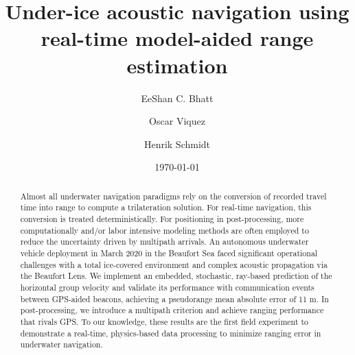 \title[JASA/draft]{Under-ice acoustic navigation using real-time model-aided range estimation}
\author{EeShan C. Bhatt}
\author{Oscar Viquez}
\author{Henrik Schmidt}



\date{\today}

\begin{abstract}
Almost all underwater navigation paradigms rely on the conversion of recorded travel time into range to compute a trilateration solution.
For real-time navigation, this conversion is treated deterministically.
For positioning in post-processing, more computationally and/or labor intensive modeling methods are often employed to reduce the uncertainty driven by multipath arrivals.
An autonomous underwater vehicle deployment in March 2020 in the Beaufort Sea faced significant operational challenges with a total ice-covered environment and complex acoustic propagation via the Beaufort Lens.
We implement an embedded, stochastic, ray-based prediction of the horizontal group velocity and validate its performance with communication events between GPS-aided beacons, achieving a pseudorange mean absolute error of 11 m.
In post-processing, we introduce a multipath criterion and achieve ranging performance that rivals GPS.
To our knowledge, these results are the first field experiment to demonstrate a real-time, physics-based data processing to minimize ranging error in underwater navigation.
\end{abstract}


\maketitle



